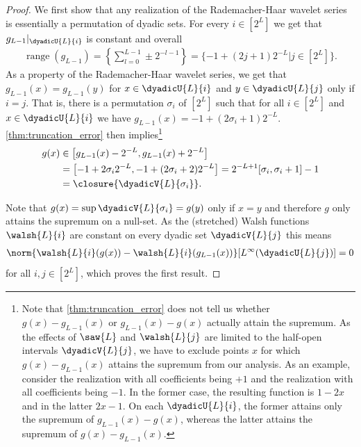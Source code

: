 \documentclass[twoside,11pt]{article}
\begin{document}
\begin{proof}
We first show that any realization of the Rademacher-Haar wavelet series is essentially a permutation of dyadic sets.    
For every $i\in[2^L]$ we get that $g_{L-1}|_{\dyadicU{L}{i}}$ is constant and overall
\begin{align}
    \operatorname{range}(g_{L-1})
    =
    \left\{\sum_{l=0}^{L-1}\pm 2^{-l-1}\right\}
    =
    \{-1+(2j+1)2^{-L}|j\in[2^L]\}.
\end{align}
As a property of the Rademacher-Haar wavelet series, we get that $g_{L-1}(x)=g_{L-1}(y)$ for $x\in\dyadicU{L}{i}$ and $y\in\dyadicU{L}{j}$ only if $i=j$.
That is, there is a permutation $\sigma_i$ of $[2^L]$ such that for all $i\in[2^L]$ and $x\in\dyadicU{L}{i}$ we have $g_{L-1}(x)=-1+(2\sigma_i+1)2^{-L}$.
\cref{thm:truncation_error} then implies\footnote{Note that \cref{thm:truncation_error} does not tell us whether $g(x)-g_{L-1}(x)$ or $g_{L-1}(x)-g(x)$ actually attain the supremum.
As the effects of $\saw{L}$ and $\walsh{L}{j}$ are limited to the half-open intervals $\dyadicV{L}{j}$, we have to exclude points $x$ for which $g(x)-g_{L-1}(x)$ attains the supremum from our analysis.
As an example, consider the realization with all coefficients being $+1$ and the realization with all coefficients being $-1$.
In the former case, the resulting function is $1-2x$ and in the latter $2x-1$.
On each $\dyadicU{L}{i}$, the former attains only the supremum of $g_{L-1}(x)-g(x)$, whereas the latter attains the supremum of $g(x)-g_{L-1}(x)$.}
\begin{align}
    g(x)
    &\in
    \left[g_{L-1}(x)-2^{-L},g_{L-1}(x)+2^{-L}\right]
    \\&
    =
    \left[-1+2\sigma_i2^{-L},-1+(2\sigma_i+2)2^{-L}\right]
    =
    2^{-L+1}[\sigma_i,\sigma_i+1]-1
    \\&
    =
    \closure{\dyadicV{L}{\sigma_i}}.
\end{align}

Note that $g(x)=\sup \dyadicV{L}{\sigma_i}=g(y)$ only if $x=y$ and therefore $g$ only attains the supremum on a null-set.
As the (stretched) Walsh functions $\walsh{L}{i}$ are constant on every dyadic set $\dyadicV{L}{j}$ this means
\begin{align}
    \norm{\walsh{L}{i}(g(x))-\walsh{L}{i}(g_{L-1}(x))}[{L^\infty(\dyadicU{L}{j})}]=0
\end{align}
for all $i,j\in[2^L]$, which proves the first result.



\end{proof}
\end{document}
